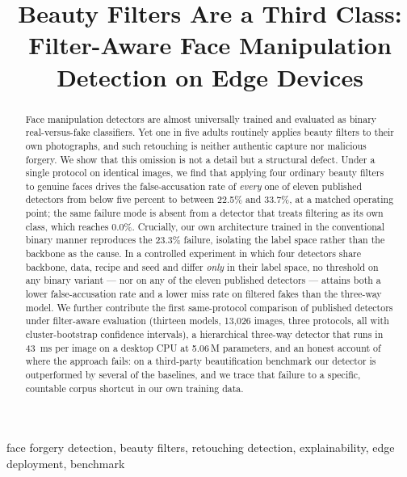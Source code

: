 \documentclass[conference]{IEEEtran}
\begin{document}
\title{Beauty Filters Are a Third Class:\\
Filter-Aware Face Manipulation Detection on Edge Devices}

\author{
}

\maketitle

\begin{abstract}
Face manipulation detectors are almost universally trained and evaluated as binary
real-versus-fake classifiers. Yet one in five adults routinely applies beauty filters to
their own photographs, and such retouching is neither authentic capture nor malicious
forgery. We show that this omission is not a detail but a structural defect. Under a
single protocol on identical images, we find that applying four ordinary beauty filters to
genuine faces drives the false-accusation rate of \emph{every} one of eleven published
detectors from below five percent to between 22.5\% and 33.7\%, at a matched operating
point; the same failure mode is absent from a detector that treats filtering as its own
class, which reaches 0.0\%. Crucially, our own architecture trained in the conventional
binary manner reproduces the 23.3\% failure, isolating the label space rather than the
backbone as the cause. In a controlled experiment in which four detectors share backbone, data, recipe and
seed and differ \emph{only} in their label space, no threshold on any binary variant ---
nor on any of the eleven published detectors --- attains both a lower false-accusation
rate and a lower miss rate on filtered fakes than the three-way model.
We further contribute the first
same-protocol comparison of published detectors under filter-aware evaluation
(thirteen models, 13{,}026 images, three protocols, all with cluster-bootstrap
confidence intervals), a hierarchical three-way detector that runs in
\SI{43}{\milli\second} per image on a desktop CPU at 5.06\,M parameters, and an honest
account of where the approach fails: on a third-party beautification benchmark our
detector is outperformed by several of the baselines, and we trace that failure to a
specific, countable corpus shortcut in our own training data.
\end{abstract}

\begin{IEEEkeywords}
face forgery detection, beauty filters, retouching detection, explainability,
edge deployment, benchmark
\end{IEEEkeywords}
\end{document}
